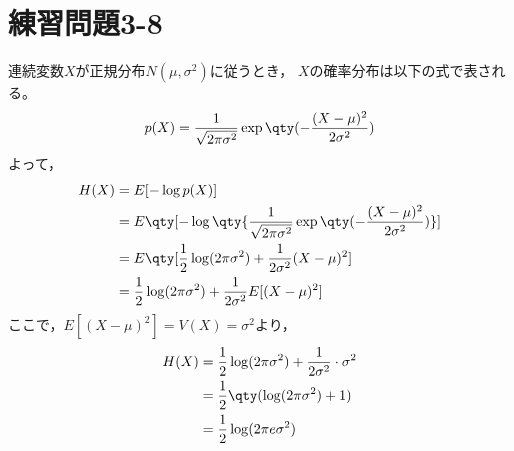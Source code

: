 \documentclass[class=jsarticle, crop=false, dvipdfmx, fleqn]{standalone}
\begin{document}
\section{練習問題3-8}
連続変数$X$が正規分布$N(\mu, \sigma^2)$に従うとき，
$X$の確率分布は以下の式で表される。
\begin{equation}
p(X) = \frac{1}{\sqrt{2 \pi \sigma^2}} \exp\qty(- \frac{(X - \mu)^2}{2 \sigma^2})
\end{equation}
よって，
\begin{equation}
\begin{split}
H(X) & = E[-\log p(X)] \\
	& = E\qty[- \log\qty{\frac{1}{\sqrt{2 \pi \sigma^2}} \exp\qty(- \frac{(X - \mu)^2}{2 \sigma^2})}] \\
	& = E\qty[\frac{1}{2} \log(2 \pi \sigma^2) + \frac{1}{2 \sigma^2} (X - \mu)^2] \\
	& = \frac{1}{2} \log(2 \pi \sigma^2) + \frac{1}{2 \sigma^2} E[(X - \mu)^2]
\end{split}
\end{equation}
ここで，$E[(X - \mu)^2] = V(X) = \sigma^2$より，
\begin{equation}
\begin{split}
H(X) & = \frac{1}{2} \log(2 \pi \sigma^2) + \frac{1}{2 \sigma^2} \cdot \sigma^2 \\
	& = \frac{1}{2} \qty(\log(2 \pi \sigma^2) + 1) \\
	& = \frac{1}{2} \log(2 \pi e \sigma^2)
\end{split}
\end{equation}
\end{document}

